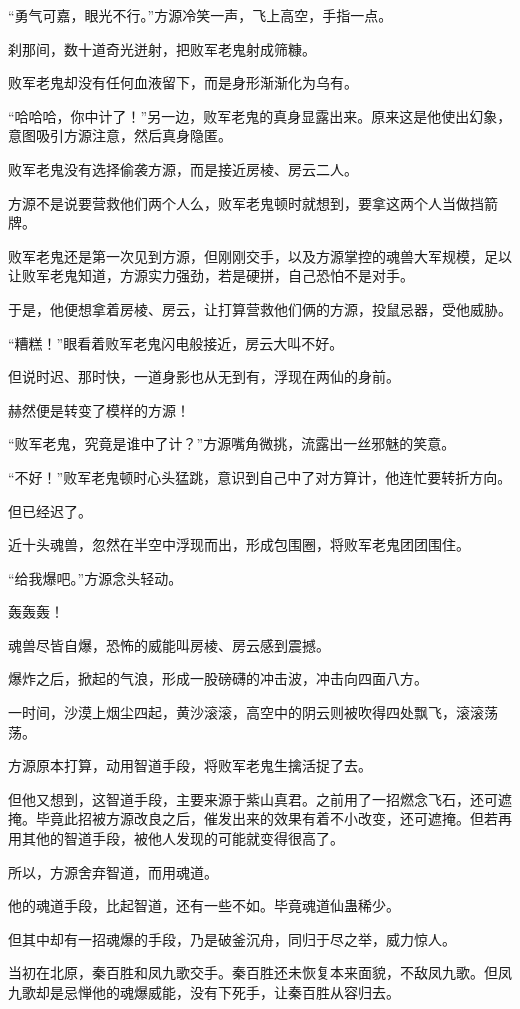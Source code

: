 \begin{this_body}
“勇气可嘉，眼光不行。”方源冷笑一声，飞上高空，手指一点。

刹那间，数十道奇光迸射，把败军老鬼射成筛糠。

败军老鬼却没有任何血液留下，而是身形渐渐化为乌有。

“哈哈哈，你中计了！”另一边，败军老鬼的真身显露出来。原来这是他使出幻象，意图吸引方源注意，然后真身隐匿。

败军老鬼没有选择偷袭方源，而是接近房棱、房云二人。

方源不是说要营救他们两个人么，败军老鬼顿时就想到，要拿这两个人当做挡箭牌。

败军老鬼还是第一次见到方源，但刚刚交手，以及方源掌控的魂兽大军规模，足以让败军老鬼知道，方源实力强劲，若是硬拼，自己恐怕不是对手。

于是，他便想拿着房棱、房云，让打算营救他们俩的方源，投鼠忌器，受他威胁。

“糟糕！”眼看着败军老鬼闪电般接近，房云大叫不好。

但说时迟、那时快，一道身影也从无到有，浮现在两仙的身前。

赫然便是转变了模样的方源！

“败军老鬼，究竟是谁中了计？”方源嘴角微挑，流露出一丝邪魅的笑意。

“不好！”败军老鬼顿时心头猛跳，意识到自己中了对方算计，他连忙要转折方向。

但已经迟了。

近十头魂兽，忽然在半空中浮现而出，形成包围圈，将败军老鬼团团围住。

“给我爆吧。”方源念头轻动。

轰轰轰！

魂兽尽皆自爆，恐怖的威能叫房棱、房云感到震撼。

爆炸之后，掀起的气浪，形成一股磅礴的冲击波，冲击向四面八方。

一时间，沙漠上烟尘四起，黄沙滚滚，高空中的阴云则被吹得四处飘飞，滚滚荡荡。

方源原本打算，动用智道手段，将败军老鬼生擒活捉了去。

但他又想到，这智道手段，主要来源于紫山真君。之前用了一招燃念飞石，还可遮掩。毕竟此招被方源改良之后，催发出来的效果有着不小改变，还可遮掩。但若再用其他的智道手段，被他人发现的可能就变得很高了。

所以，方源舍弃智道，而用魂道。

他的魂道手段，比起智道，还有一些不如。毕竟魂道仙蛊稀少。

但其中却有一招魂爆的手段，乃是破釜沉舟，同归于尽之举，威力惊人。

当初在北原，秦百胜和凤九歌交手。秦百胜还未恢复本来面貌，不敌凤九歌。但凤九歌却是忌惮他的魂爆威能，没有下死手，让秦百胜从容归去。


\end{this_body}
